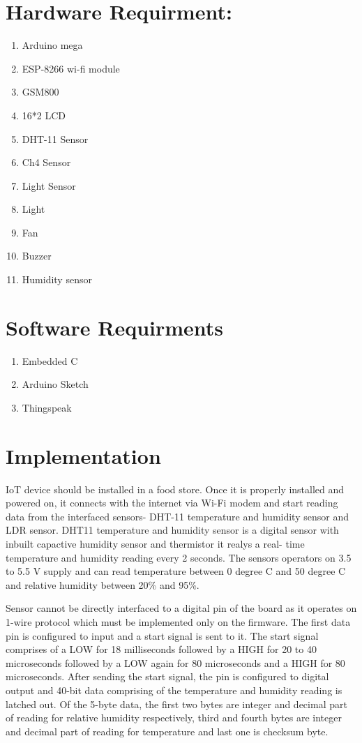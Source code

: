 \documentclass{report}
\begin{document}
\begin{multicols}{1}
    \section*{Hardware Requirment:}
    \begin{enumerate}
    \item Arduino mega
    \item ESP-8266 wi-fi module
    \item GSM800
    \item 16*2 LCD
    \item DHT-11 Sensor
    \item Ch4 Sensor
    \item Light Sensor
    \item Light 
    \item Fan
    \item Buzzer
    \item Humidity sensor
        
    \end{enumerate}
 
    \section*{Software Requirments}
    \begin{enumerate}
        \item Embedded C
        \item Arduino Sketch
        \item Thingspeak 
    \end{enumerate}

    \section*{Implementation}
    IoT device should be installed in a food store. Once it is properly installed and powered on, it connects with the internet via Wi-Fi modem and start reading data from the interfaced sensors- DHT-11 temperature and humidity sensor and LDR sensor. DHT11 temperature and humidity sensor is a digital sensor with inbuilt capactive humidity sensor and thermistor it realys a real- time temperature and humidity reading every 2 seconds. The sensors operators on 3.5 to 5.5 V supply and can read temperature between 0 degree C and 50 degree C and relative humidity between 20\% and 95\%.
    
    Sensor cannot be directly interfaced to a digital pin of the board as it operates on 1-wire protocol which must be implemented only on the firmware. The first data pin is configured to input and a start signal is sent to it. The start signal comprises of a LOW for 18 milliseconds followed by a HIGH for 20 to 40 microseconds followed by a LOW again for 80 microseconds and a HIGH for 80 microseconds. After sending the start signal, the pin is configured to digital output and 40-bit data comprising of the temperature and humidity reading is latched out. Of the 5-byte data, the first two bytes are integer and decimal part of reading for relative humidity respectively, third and fourth bytes are integer and decimal part of reading for temperature and last one is checksum byte.
    

\end{multicols}
\end{document}

